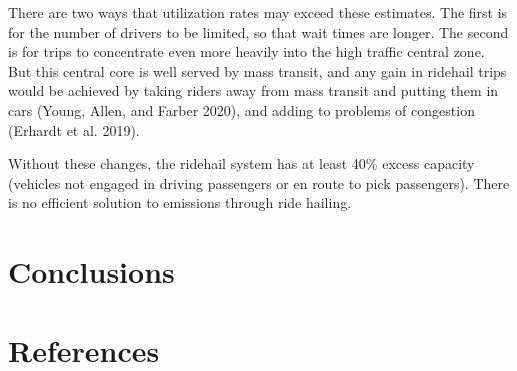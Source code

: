 \documentclass[
  letterpaper,
]{article}
\begin{document}
There are two ways that utilization rates may exceed these estimates.
The first is for the number of drivers to be limited, so that wait times
are longer. The second is for trips to concentrate even more heavily
into the high traffic central zone. But this central core is well served
by mass transit, and any gain in ridehail trips would be achieved by
taking riders away from mass transit and putting them in cars (Young,
Allen, and Farber 2020), and adding to problems of congestion (Erhardt
et al. 2019).

Without these changes, the ridehail system has at least 40\% excess
capacity (vehicles not engaged in driving passengers or en route to pick
passengers). There is no efficient solution to emissions through ride
hailing.

\hypertarget{conclusions}{%
\section{Conclusions}\label{conclusions}}

\hypertarget{references}{%
\section*{References}\label{references}}
\end{document}
